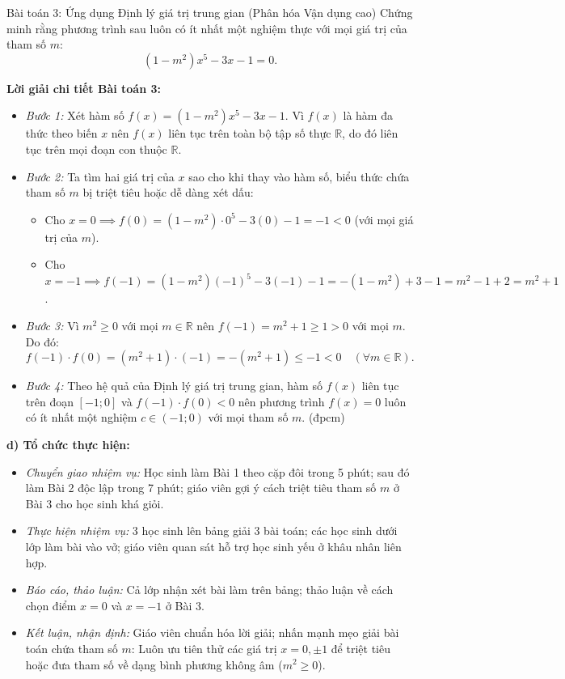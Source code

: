 \documentclass[12pt, a4paper]{article}
\begin{document}
\begin{pedabox}{Bài toán 3: Ứng dụng Định lý giá trị trung gian (Phân hóa Vận dụng cao)}
Chứng minh rằng phương trình sau luôn có ít nhất một nghiệm thực với mọi giá trị của tham số $m$:
$$(1 - m^2)x^5 - 3x - 1 = 0.$$
\end{pedabox}

\noindent \textbf{Lời giải chi tiết Bài toán 3:}
\begin{itemize}[leftmargin=0.6cm]
    \item \textit{Bước 1:} Xét hàm số $f(x) = (1 - m^2)x^5 - 3x - 1$.
    Vì $f(x)$ là hàm đa thức theo biến $x$ nên $f(x)$ liên tục trên toàn bộ tập số thực $\mathbb{R}$, do đó liên tục trên mọi đoạn con thuộc $\mathbb{R}$.
    \item \textit{Bước 2:} Ta tìm hai giá trị của $x$ sao cho khi thay vào hàm số, biểu thức chứa tham số $m$ bị triệt tiêu hoặc dễ dàng xét dấu:
    \begin{itemize}
        \item Cho $x = 0 \implies f(0) = (1 - m^2) \cdot 0^5 - 3(0) - 1 = -1 < 0$ (với mọi giá trị của $m$).
        \item Cho $x = -1 \implies f(-1) = (1 - m^2)(-1)^5 - 3(-1) - 1 = -(1 - m^2) + 3 - 1 = m^2 - 1 + 2 = m^2 + 1$.
    \end{itemize}
    \item \textit{Bước 3:} Vì $m^2 \ge 0$ với mọi $m \in \mathbb{R}$ nên $f(-1) = m^2 + 1 \ge 1 > 0$ với mọi $m$.
    Do đó:
    $$f(-1) \cdot f(0) = (m^2 + 1) \cdot (-1) = -(m^2 + 1) \le -1 < 0 \quad (\forall m \in \mathbb{R}).$$
    \item \textit{Bước 4:} Theo hệ quả của Định lý giá trị trung gian, hàm số $f(x)$ liên tục trên đoạn $[-1; 0]$ và $f(-1) \cdot f(0) < 0$ nên phương trình $f(x) = 0$ luôn có ít nhất một nghiệm $c \in (-1; 0)$ với mọi tham số $m$. (đpcm)
\end{itemize}

\noindent \textbf{d) Tổ chức thực hiện:}
\begin{itemize}[leftmargin=0.8cm]
    \item \textit{Chuyển giao nhiệm vụ:} Học sinh làm Bài 1 theo cặp đôi trong 5 phút; sau đó làm Bài 2 độc lập trong 7 phút; giáo viên gợi ý cách triệt tiêu tham số $m$ ở Bài 3 cho học sinh khá giỏi.
    \item \textit{Thực hiện nhiệm vụ:} 3 học sinh lên bảng giải 3 bài toán; các học sinh dưới lớp làm bài vào vở; giáo viên quan sát hỗ trợ học sinh yếu ở khâu nhân liên hợp.
    \item \textit{Báo cáo, thảo luận:} Cả lớp nhận xét bài làm trên bảng; thảo luận về cách chọn điểm $x = 0$ và $x = -1$ ở Bài 3.
    \item \textit{Kết luận, nhận định:} Giáo viên chuẩn hóa lời giải; nhấn mạnh mẹo giải bài toán chứa tham số $m$: Luôn ưu tiên thử các giá trị $x = 0, \pm 1$ để triệt tiêu hoặc đưa tham số về dạng bình phương không âm ($m^2 \ge 0$).
\end{itemize}
\end{document}
